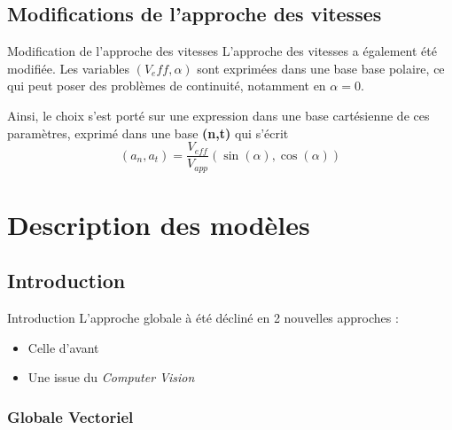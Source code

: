 \documentclass[
11pt,notheorems,hyperref={pdfauthor=whatever}
]{beamer}
\begin{document}
\subsection{Modifications de l'approche des vitesses}

\begin{frame}{Modification de l'approche des vitesses}
    L'approche des vitesses a également été modifiée. Les variables $(V_eff, \alpha )$ sont exprimées dans une base base polaire, ce
    qui peut poser des problèmes de continuité, notamment en $\alpha = 0$. 
    
    \vspace{0.3cm}

    Ainsi, le choix s'est porté sur une expression dans une base cartésienne de ces paramètres, exprimé dans une base \textbf{(n,t)} qui s'écrit
    \[
        (a_n, a_t) = \frac{V_{eff}}{V_{app}}(\sin(\alpha), \cos(\alpha))
    \]
\end{frame}


\section{Description des modèles}

\subsection{Introduction}

\begin{frame}{Introduction}
    L'approche globale à été décliné en 2 nouvelles approches : 
    \begin{itemize}
        \item Celle d'avant
        \item Une issue du \textit{Computer Vision}
    \end{itemize}
\end{frame}

\subsubsection{Globale Vectoriel}
\end{document}

